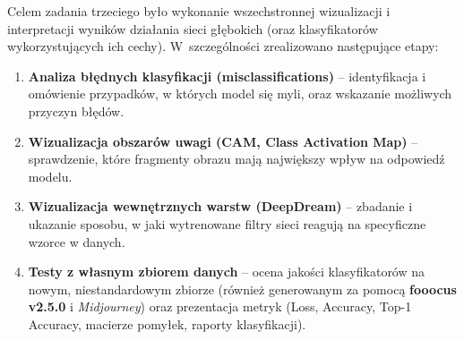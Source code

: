 
\label{sec:z3}

Celem zadania trzeciego było wykonanie wszechstronnej wizualizacji i interpretacji wyników działania sieci głębokich (oraz klasyfikatorów wykorzystujących ich cechy). W~szczególności zrealizowano następujące etapy:
\begin{enumerate}
    \item \textbf{Analiza błędnych klasyfikacji (misclassifications)} -- identyfikacja i omówienie przypadków, w których model się myli, oraz wskazanie możliwych przyczyn błędów.
    \item \textbf{Wizualizacja obszarów uwagi (CAM, Class Activation Map)} -- sprawdzenie, które fragmenty obrazu mają największy wpływ na odpowiedź modelu.
    \item \textbf{Wizualizacja wewnętrznych warstw (DeepDream)} -- zbadanie i ukazanie sposobu, w jaki wytrenowane filtry sieci reagują na specyficzne wzorce w danych.
    \item \textbf{Testy z własnym zbiorem danych} -- ocena jakości klasyfikatorów na nowym, niestandardowym zbiorze (również generowanym za pomocą \textbf{fooocus v2.5.0} i \emph{Midjourney}) oraz prezentacja metryk (Loss, Accuracy, Top-1 Accuracy, macierze pomyłek, raporty klasyfikacji).
\end{enumerate}


